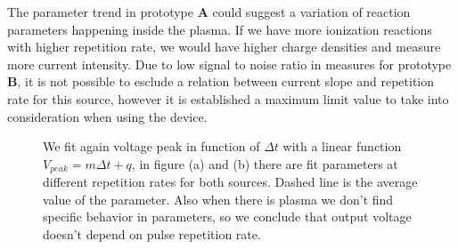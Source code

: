 The parameter trend in prototype \textbf{A} could suggest a variation of reaction parameters happening inside the plasma. If we have more ionization reactions with higher repetition rate, we would have higher charge densities and measure more current intensity. Due to low signal to noise ratio in measures for prototype \textbf{B}, it is not possible to esclude a relation between current slope and repetition rate for this source, however it is established a maximum limit value to take into consideration when using the device.
\begin{figure}
 \centering
 \hfill
 \caption{We fit again voltage peak in function of $\Delta t$ with a linear function $V_{peak} = m \Delta t + q$, in figure (a) and (b) there are fit parameters at different repetition rates for both sources. Dashed line is the average value of the parameter. Also when there is plasma we don't find specific behavior in parameters, so we conclude that output voltage doesn't depend on pulse repetition rate.}
 \label{fig:lingas_Vpp}
\end{figure}


